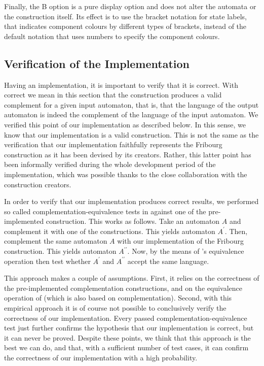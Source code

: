 Finally, the B option is a pure display option and does not alter the automata or the construction itself. Its effect is to use the bracket notation for state labels, that indicates component colours by different types of brackets, instead of the default notation that uses numbers to specify the component colours.


\subsection{Verification of the Implementation}
\label{4_verification}
Having an implementation, it is important to verify that it is correct. With correct we mean in this section that the construction produces a valid complement for a given input automaton, that is, that the language of the output automaton is indeed the complement of the language of the input automaton. We verified this point of our implementation as described below. In this sense, we know that our implementation is a valid construction. This is not the same as the verification that our implementation faithfully represents the Fribourg construction as it has been devised by its creators. Rather, this latter point has been informally verified during the whole development period of the implementation, which was possible thanks to the close collaboration with the construction creators.

In order to verify that our implementation produces correct results, we performed so called complementation-equivalence tests in \goal{} against one of the pre-implemented construction. This works as follows. Take an automaton $A$ and complement it with one of the \goal{} constructions. This yields automaton $A^\prime$. Then, complement the same automaton $A$ with our implementation of the Fribourg construction. This yields automaton $A^{\prime\prime}$. Now, by the means of \goal's equivalence operation then test whether $A^\prime$ and $A^{\prime\prime}$ accept the same language.

This approach makes a couple of assumptions. First, it relies on the correctness of the pre-implemented complementation constructions, and on the equivalence operation of \goal{} (which is also based on complementation). Second, with this empirical approach it is of course not possible to conclusively verify the correctness of our implementation. Every passed complementation-equivalence test just further confirms the hypothesis that our implementation is correct, but it can never be proved. Despite these points, we think that this approach is the best we can do, and that, with a sufficient number of test cases, it can confirm the correctness of our implementation with a high probability.

